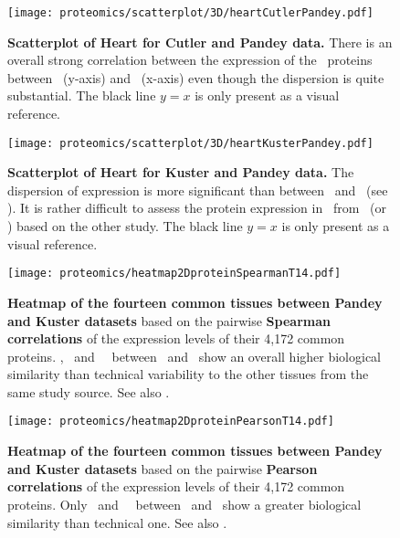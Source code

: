 \begin{figure}[!htpb]
    \texttt{[image: proteomics/scatterplot/3D/heartCutlerPandey.pdf]}\centering
    \caption[Heart: Cutler vs Pandey]{\label{fig:scat3DheartCutlerPandey}\textbf{%
    Scatterplot of Heart for Cutler and Pandey data.}
    There is an overall strong correlation between
    the expression of the \heart\ proteins
    between \pandey\ (y-axis) and \cutler\ (x-axis)
    even though the dispersion is quite substantial.
    {\small The black line $y=x$ is only present as a visual reference.}}
\end{figure}

\begin{figure}[!htpb]
    \texttt{[image: proteomics/scatterplot/3D/heartKusterPandey.pdf]}\centering
    \caption[Heart: Kuster vs Pandey]{\label{fig:scat3DheartKusterPandey}\textbf{%
    Scatterplot of Heart for Kuster and Pandey data.}
    The dispersion of expression is more significant than between \pandey\ and \cutler\
    (see ).
    It is rather difficult to assess the protein expression in \Heart\ from
    \pandey\ (or \kuster) based on the other study.
    {\small The black line $y=x$ is only present as a visual reference.}}
\end{figure}

\begin{figure}[!htpb]
    \texttt{[image: proteomics/heatmap2DproteinSpearmanT14.pdf]}\centering
    \caption[Heatmap of the 14 common tissues between Pandey and Kuster datasets
    (Spearman correlation)]{\label{fig:prot2DheatmapT14}\textbf{Heatmap of
    the fourteen common tissues between Pandey and Kuster datasets}
    based on the pairwise \textbf{Spearman correlations} of the expression levels of
    their 4,172 common proteins.
    \Placenta, \Lung\ and \Kidney\ \treps\ between \pandey\ and \kuster\ show
    an overall higher biological similarity than technical variability
    to the other tissues from the same study source.
    See also .}
\end{figure}


\begin{figure}[!htpb]
    \texttt{[image: proteomics/heatmap2DproteinPearsonT14.pdf]}\centering
    \caption[Heatmap of the 14 common tissues between Pandey and Kuster
    datasets (Pearson correlation)]{\label{fig:prot2DheatmapPearson}\textbf{Heatmap
    of the fourteen common tissues between Pandey and Kuster datasets}
    based on the pairwise \textbf{Pearson correlations} of the expression levels of
    their 4,172 common proteins.
    Only \Placenta\ and \Adrenal\ \treps\ between \pandey\ and \kuster\ show
    a greater biological similarity than technical one.
    See also .}
\end{figure}

